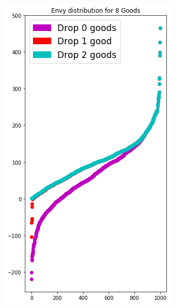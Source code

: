 \begin{figure}[h!]
\begin{subfigure}[b]{0.47\linewidth}
    \includegraphics[width=\linewidth]{images/envy_density/envy_density_us18.png}
    \caption{}
  \end{subfigure}
  \begin{subfigure}[b]{0.47\linewidth}

\end{subfigure}
\end{figure}

